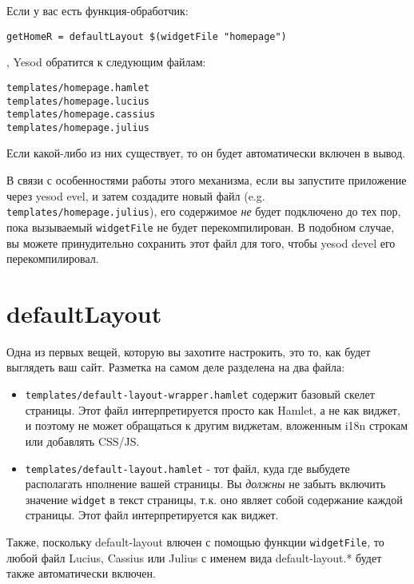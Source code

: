 Если у вас есть функция-обработчик:

\begin{lstlisting}
getHomeR = defaultLayout $(widgetFile "homepage")
\end{lstlisting}%

, Yesod обратится к следующим файлам:

\begin{lstlisting}
templates/homepage.hamlet
templates/homepage.lucius
templates/homepage.cassius
templates/homepage.julius
\end{lstlisting}

Если какой-либо из них существует, то он будет автоматически включен в вывод.

\begin{remark}
  В связи с особенностями работы этого механизма, если вы запустите приложение через
  yesod evel, и затем создадите новый файл (e.g. \lstinline!templates/homepage.julius!),
  его содержимое \emph{не} будет подключено до тех пор, пока вызываемый \lstinline!widgetFile!
  не будет перекомпилирован.  В подобном случае, вы можете принудительно сохранить
  этот файл для того, чтобы yesod devel его перекомпилировал.
\end{remark}

\section{defaultLayout}

Одна из первых вещей, которую вы захотите настрокить, это то, как будет выглядеть ваш сайт.
Разметка на самом деле разделена на два файла:
\begin{itemize}
  \item \lstinline!templates/default-layout-wrapper.hamlet! содержит базовый скелет
    страницы. Этот файл интерпретируется просто как Hamlet, а не как виджет, и поэтому
    не может обращаться к другим виджетам, вложенным i18n строкам или добавлять CSS/JS.
  \item \lstinline!templates/default-layout.hamlet! - тот файл, куда где выбудете располагать
    нполнение вашей страницы. Вы \emph{должны} не забыть включить значение \lstinline!widget!
    в текст страницы, т.к. оно являет собой содержание каждой страницы. Этот файл
    интерпретируется как виджет.
\end{itemize}

Также, поскольку default-layout влючен с помощью функции \lstinline!widgetFile!, то любой
файл Lucius, Cassius или Julius с именем вида default-layout.* будет также автоматически включен.


